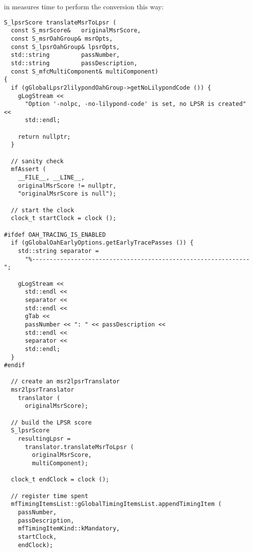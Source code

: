 \newpage

 in  measures time to perform the conversion this way:
\begin{lstlisting}[language=CPlusPlus]
S_lpsrScore translateMsrToLpsr (
  const S_msrScore&   originalMsrScore,
  const S_msrOahGroup& msrOpts,
  const S_lpsrOahGroup& lpsrOpts,
  std::string         passNumber,
  std::string         passDescription,
  const S_mfcMultiComponent& multiComponent)
{
  if (gGlobalLpsr2lilypondOahGroup->getNoLilypondCode ()) {
    gLogStream <<
      "Option '-nolpc, -no-lilypond-code' is set, no LPSR is created" <<
      std::endl;

    return nullptr;
  }

  // sanity check
  mfAssert (
    __FILE__, __LINE__,
    originalMsrScore != nullptr,
    "originalMsrScore is null");

  // start the clock
  clock_t startClock = clock ();

#ifdef OAH_TRACING_IS_ENABLED
  if (gGlobalOahEarlyOptions.getEarlyTracePasses ()) {
    std::string separator =
      "%--------------------------------------------------------------";

    gLogStream <<
      std::endl <<
      separator <<
      std::endl <<
      gTab <<
      passNumber << ": " << passDescription <<
      std::endl <<
      separator <<
      std::endl;
  }
#endif

  // create an msr2lpsrTranslator
  msr2lpsrTranslator
    translator (
      originalMsrScore);

  // build the LPSR score
  S_lpsrScore
    resultingLpsr =
      translator.translateMsrToLpsr (
        originalMsrScore,
        multiComponent);

  clock_t endClock = clock ();

  // register time spent
  mfTimingItemsList::gGlobalTimingItemsList.appendTimingItem (
    passNumber,
    passDescription,
    mfTimingItemKind::kMandatory,
    startClock,
    endClock);
\end{lstlisting}
